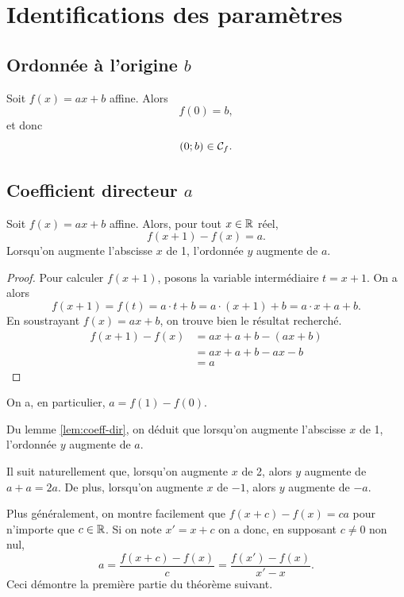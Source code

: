 \documentclass[a4paper, 12pt]{report}
\begin{document}
\section{Identifications des paramètres}

\subsection{Ordonnée à l'origine $b$}

\begin{lem}
	Soit $f(x) = a x + b$ affine.
	Alors
		\[ f(0) = b, \]
	et donc
		\[ (0 ; b) \in \mathcal{C}_f. \]
\end{lem}

\subsection{Coefficient directeur $a$}

\begin{lem}
\label{lem:coeff-dir}
	Soit $f(x) = a x + b$ affine.
	Alors, pour tout $x\in\mathbb{R}$ réel,
		\[ f(x+1) - f(x) = a. \]
	Lorsqu'on augmente l'abscisse $x$ de 1, l'ordonnée $y$ augmente de $a$.
\end{lem}

\begin{proof}
	Pour calculer $f(x+1)$, posons la variable intermédiaire $t = x+1$.
	On a alors
		\[ f(x+1) = f(t) = a\cdot t + b = a\cdot (x+1) + b = a \cdot x + a + b. \]
	En soustrayant $f(x) = ax+b$, on trouve bien le résultat recherché.
		\begin{align*}
			f(x+1) - f(x) &= ax + a + b - (ax + b) \\ &= ax + a + b -ax -b \\ &= a
		\end{align*}
\end{proof}

\begin{coro}
	On a, en particulier,
		$ a = f(1) - f(0).$
\end{coro}


\begin{rmq}
	Du lemme \ref{lem:coeff-dir}, on déduit que lorsqu'on augmente l'abscisse $x$ de 1, l'ordonnée $y$ augmente de $a$.
	
	Il suit naturellement que, lorsqu'on augmente $x$ de 2, alors $y$ augmente de $a+a = 2a$.
	De plus, lorsqu'on augmente $x$ de $-1$, alors $y$ augmente de $-a$.
	
	Plus généralement, on montre facilement que $f(x+c) - f(x) = ca$ pour n'importe que $c\in\mathbb{R}$.
	Si on note $x' = x+c$ on a donc, en supposant $c \neq 0$ non nul,
		\[ a = \dfrac{f(x+c)-f(x)}{c} = \dfrac{f(x') - f(x)}{x' - x}. \]
	Ceci démontre la première partie du théorème suivant.
\end{rmq}
\end{document}
